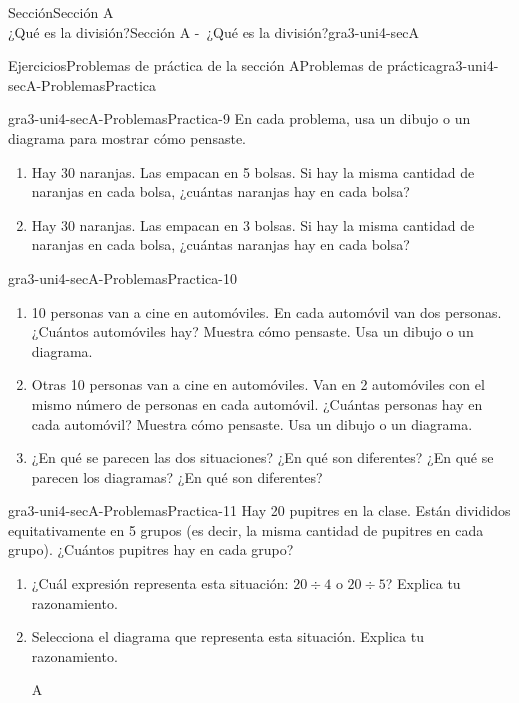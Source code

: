 \begin{sectionptx}{Sección}{{\Large Sección A\\}¿Qué es la división?}{}{Sección A -~¿Qué es la división?}{}{}{gra3-uni4-secA}
\begin{exercises-subsection}{Ejercicios}{Problemas de práctica de la sección A}{}{Problemas de práctica}{}{}{gra3-uni4-secA-ProblemasPractica}
\begin{divisionexercise}{7}{}{}{gra3-uni4-secA-ProblemasPractica-9}%
En cada problema, usa un dibujo o un diagrama para mostrar cómo pensaste.%
%
\begin{enumerate}[label={(\alph*)}]
\item{}Hay 30 naranjas. Las empacan en 5 bolsas. Si hay la misma cantidad de naranjas en cada bolsa, ¿cuántas naranjas hay en cada bolsa?%
\item{}Hay 30 naranjas. Las empacan en 3 bolsas. Si hay la misma cantidad de naranjas en cada bolsa, ¿cuántas naranjas hay en cada bolsa?%
\end{enumerate}
\end{divisionexercise}%
\begin{divisionexercise}{8}{}{}{gra3-uni4-secA-ProblemasPractica-10}%
%
\begin{enumerate}[label={(\alph*)}]
\item{}10 personas van a cine en automóviles. En cada automóvil van dos personas. ¿Cuántos automóviles hay? Muestra cómo pensaste. Usa un dibujo o un diagrama.%
\item{}Otras 10 personas van a cine en automóviles. Van en 2 automóviles con el mismo número de personas en cada automóvil. ¿Cuántas personas hay en cada automóvil? Muestra cómo pensaste. Usa un dibujo o un diagrama.%
\item{}¿En qué se parecen las dos situaciones? ¿En qué son diferentes? ¿En qué se parecen los diagramas? ¿En qué son diferentes?%
\end{enumerate}
%
\end{divisionexercise}%
\begin{divisionexercise}{9}{}{}{gra3-uni4-secA-ProblemasPractica-11}%
Hay 20 pupitres en la clase. Están divididos equitativamente en 5 grupos (es decir, la misma cantidad de pupitres en cada grupo). ¿Cuántos pupitres hay en cada grupo?%
\par
%
\begin{enumerate}[label={(\alph*)}]
\item{}¿Cuál expresión representa esta situación: \(20\div 4\) o \(20\div 5\)? Explica tu razonamiento.%
\item{}Selecciona el diagrama que representa esta situación. Explica tu razonamiento.%
\begin{sidebyside}{2}{0}{0}{0}%
\begin{sbspanel}{0.07}%
A%
\end{sbspanel}%
\begin{sbspanel}{0.93}%

\end{sbspanel}
\end{sidebyside}
\end{enumerate}
\end{divisionexercise}
\end{exercises-subsection}
\end{sectionptx}
